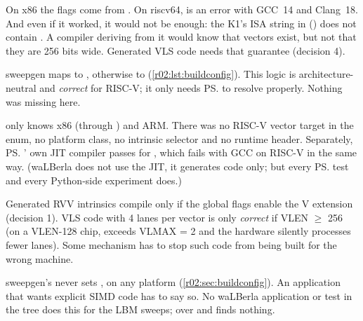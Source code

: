 \begin{description}[style=nextline]
  \item[\rmark{1} Compiler flags (waLBerla CMake)] On x86 the flags come from
    . On riscv64,  is an error with GCC~14 and
    Clang~18. And even if it worked, it would not be enough: the K1's ISA string in
     () does
    not contain . A compiler deriving  from it would know
    that vectors exist, but not that they are 256 bits wide. Generated VLS code needs
    that guarantee (decision 4).
  \item[\rmark{2} Target selection (sweepgen)] sweepgen maps
     to , otherwise to
     (\cref{r02:lst:buildconfig}). This logic is
    architecture-neutral and \emph{correct} for RISC-V; it only needs \ps{} to resolve
     properly. Nothing was missing here.
  \item[\rmark{3} Target resolution and code generation (\ps{})]
     only knows x86 (through ) and ARM. There
    was no RISC-V vector target in the  enum, no platform class, no
    intrinsic selector and no runtime header. Separately, \ps{}' own JIT compiler
    passes  for , which fails with GCC on RISC-V
    in the same way. (waLBerla does not use the JIT, it generates code only; but every
    \ps{} test and every Python-side experiment does.)
  \item[\rmark{4} Compiling the generated code] Generated RVV intrinsics compile only if
    the global flags enable the V extension (decision 1). VLS code with 4 lanes per
     vector is only \emph{correct} if VLEN $\geq$ 256 (on a VLEN-128 chip,
     exceeds VLMAX = 2 and the hardware silently processes fewer lanes).
    Some mechanism has to stop such code from being built for the wrong machine.
  \item[\rmark{5} Requesting vectorization (generator script)] sweepgen's
     never sets , on any
    platform (\cref{r02:sec:buildconfig}). An application that wants explicit SIMD
    code has to say so. No waLBerla application or test in the tree does this for the
    LBM sweeps;  over  and 
    finds nothing.
\end{description}


